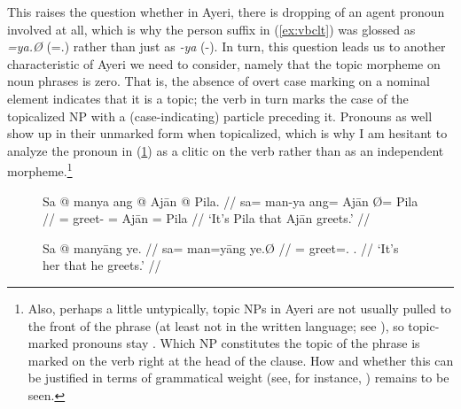 This raises the question whether in Ayeri, there is dropping of an agent
pronoun involved at all, which is why the person suffix in (\ref{ex:vbclt}) was
glossed as \emph{=ya.Ø} (\mbox{=\TsgM{}.\Top{}}) rather than just as \emph{-ya}
(-\TsgM{}). In turn, this question leads us to another characteristic of Ayeri
we need to consider, namely that the topic morpheme on noun phrases is zero.
That is, the absence of overt case marking on a nominal element indicates that
it is a topic; the verb in turn marks the case of the topicalized NP with a
(case-indicating) particle preceding it. Pronouns as well show up in their
unmarked form when topicalized, which is why I am hesitant to analyze the
pronoun in (\ref{ex:protop}) as a clitic on the verb rather than as an
independent morpheme.\footnote{Also, perhaps a little untypically, topic NPs in
Ayeri are not usually pulled to the front of the phrase (at least not in the
written language; see \cite[120--122]{lehmann2015}), so topic-marked pronouns
stay . Which NP constitutes the topic of the phrase is marked on
the verb right at the head of the clause. How and whether this can be justified
in terms of grammatical weight (see, for instance, \cite[95--98]{wasow1997})
remains to be seen.}

\begin{figure}[h]
\pex %
\a\label{ex:fullsntc}\begingl
	\gla Sa @ manya ang @ Ajān {} @ Pila. //
	\glb sa= man-ya ang= ​Ajān Ø= ​Pila //
	\glc \PatT{}= greet-\TsgM{} \Aarg{}= ​Ajān \Top{}= ​Pila //
	\glft `It's Pila that Ajān greets.' //
\endgl

\a\label{ex:protop}\begingl
	\gla Sa @ manyāng ye. //
	\glb sa= man=yāng ye.Ø //
	\glc \PatT{}= greet=\TsgM{}.\Aarg{} \TsgF{}.\Top{} //
	\glft `It's her that he greets.' //
\endgl
\xe
\end{figure}

